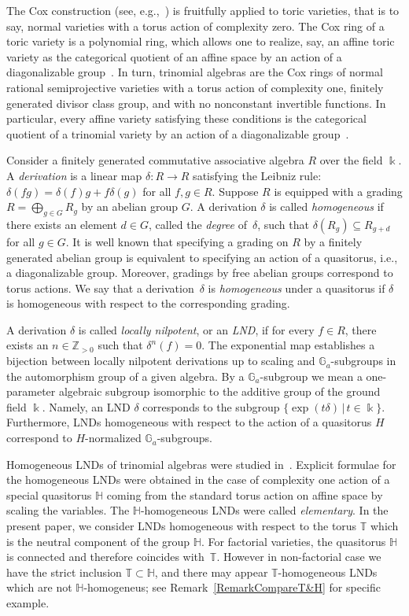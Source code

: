 \documentclass[a4paper,reqno,12pt]{amsart}
\theoremstyle{plain}
\theoremstyle{definition}
\theoremstyle{plain}
\theoremstyle{remark}
\newcommand{\TT}{\mathbb{T}}
\newcommand{\ZZ}{\mathbb Z}
\newcommand{\kk}{\Bbbk}
\newcommand{\HH}{\mathbb H}
\begin{document}
The Cox construction (see, e.g.,~\cite{ADHL}) is fruitfully applied to toric varieties, that is to say, normal varieties with a torus action of complexity zero. The Cox ring of a toric variety is a polynomial ring, which allows one to realize, say, an affine toric variety as the categorical quotient of an affine space by an action of a diagonalizable group~\cite{C}. In turn, trinomial algebras are the Cox rings of normal rational semiprojective varieties with a torus action of complexity one, finitely generated divisor class group, and with no nonconstant invertible functions. In particular, every affine variety satisfying these conditions is the categorical quotient of a trinomial variety by an action of a diagonalizable group~\cite{HH, HW}.

Consider a finitely generated commutative associative algebra $R$ over the field $\kk$. A \emph{derivation} is a linear map $\delta\colon R\to R$ satisfying the Leibniz rule: $\delta(fg) = \delta(f)g+f\delta(g)$ for all $f,g\in R$.
Suppose $R$ is equipped with a grading $R=\bigoplus_{g\in G} R_g$ by an abelian group $G$. A derivation $\delta$ is called {\it homogeneous} if there exists an element $d\in G$, called the \emph{degree} of~$\delta$, such that $\delta(R_g)\subseteq R_{g+d}$ for all $g\in G$. It is well known that specifying a grading on $R$ by a finitely generated abelian group is equivalent to specifying an action of a quasitorus, i.e., a diagonalizable group. Moreover, gradings by free abelian groups correspond to torus actions. We say that a derivation~$\delta$ is \emph{homogeneous} under a quasitorus if $\delta$ is homogeneous with respect to the corresponding grading.

A derivation $\delta$ is called \emph{locally nilpotent}, or an \emph{LND}, if for every $f\in R$, there exists an $n\in \ZZ_{>0}$ such that $\delta^n(f)=0$. The exponential map establishes a bijection between locally nilpotent derivations up to scaling and $\mathbb G_a$-subgroups in the automorphism group of a given algebra. By a $\mathbb G_a$-subgroup we mean a one-parameter algebraic subgroup isomorphic to the additive group of the ground field $\kk$. Namely, an LND $\delta$ corresponds to the subgroup $\{\exp(t\delta)\,|\,t\in \kk\}$. Furthermore, LNDs homogeneous with respect to the action of a quasitorus $H$ correspond to $H$-normalized $\mathbb G_a$-subgroups.

Homogeneous LNDs of trinomial algebras were studied in~\cite{Z, GZ, R}. Explicit formulae for the homogeneous LNDs were obtained in the case of complexity one action of a special quasitorus $\HH$ coming from the standard torus action on affine space by scaling the variables. The $\HH$-homogeneous LNDs were called \emph{elementary}. In the present paper, we consider LNDs homogeneous with respect to the torus ${\TT}$ which is the neutral component of the group $\HH$. For factorial varieties, the quasitorus $\HH$ is connected and therefore coincides with~${\TT}$. However in non-factorial case we have the strict inclusion ${\TT}\subset\HH$, and there may appear ${\TT}$-homogeneous LNDs which are not $\HH$-homogeneus; see Remark~\ref{RemarkCompareT&H} for specific example. %
\end{document}
